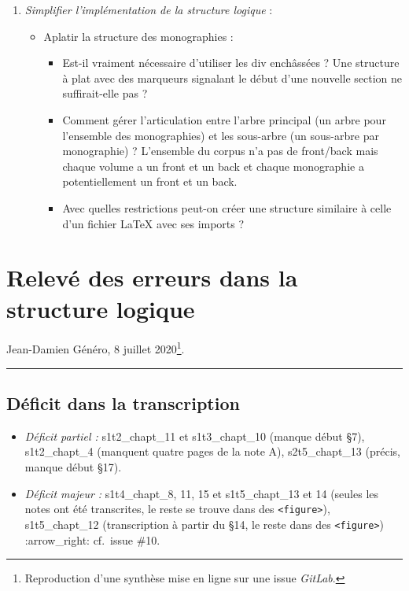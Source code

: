 \begin{enumerate}
    \item \textit{Simplifier l'implémentation de la structure logique} :
    \begin{itemize}
        \item Aplatir la structure des monographies :
        \begin{itemize}
            \item  Est-il vraiment nécessaire d'utiliser les div enchâssées ? Une structure à plat avec des marqueurs signalant le début d'une nouvelle section ne suffirait-elle pas ?
            \item  Comment gérer l'articulation entre l'arbre principal (un arbre pour l'ensemble des monographies) et les sous-arbre (un sous-arbre par monographie) ? L'ensemble du corpus n'a pas de front/back mais chaque volume a un front et un back et chaque monographie a potentiellement un front et un back.
            \item  Avec quelles restrictions peut-on créer une structure similaire à celle d'un fichier LaTeX avec ses imports ?
        \end{itemize}
    \end{itemize}
\end{enumerate}

\section{Relevé des erreurs dans la structure
logique}\label{ann:releve_erreurs}

Jean-Damien Généro, 8 juillet 2020\footnote{Reproduction d'une synthèse mise en ligne sur une issue \textit{GitLab}.}.

\begin{center}\rule{3in}{0.4pt}\end{center}

\subsection{Déficit dans la
transcription}\label{duxe9ficit-dans-la-transcription}

\begin{itemize}
\item
  \emph{Déficit partiel :} s1t2\_chapt\_11 et s1t3\_chapt\_10 (manque
  début §7), s1t2\_chapt\_4 (manquent quatre pages de la note A),
  s2t5\_chapt\_13 (précis, manque début §17).
\item
  \emph{Déficit majeur :} s1t4\_chapt\_8, 11, 15 et s1t5\_chapt\_13 et
  14 (seules les notes ont été transcrites, le reste se trouve dans des
  \texttt{\textless{}figure\textgreater{}}), s1t5\_chapt\_12
  (transcription à partir du §14, le reste dans des
  \texttt{\textless{}figure\textgreater{}}) :arrow\_right: cf.~issue
  \#10.
\end{itemize}

